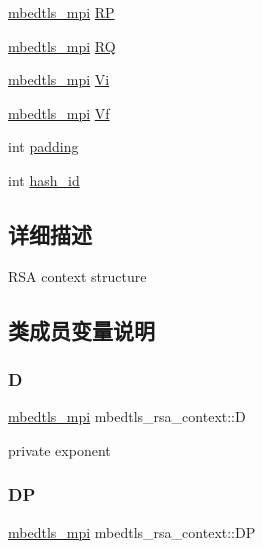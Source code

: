 \begin{DoxyCompactItemize}
\item 
\hyperlink{structmbedtls__mpi}{mbedtls\+\_\+mpi} \hyperlink{structmbedtls__rsa__context_a97215f3f5482cfb4887d00d47f030610}{RP}
\item 
\hyperlink{structmbedtls__mpi}{mbedtls\+\_\+mpi} \hyperlink{structmbedtls__rsa__context_a495e2de1f324a00ba83fe1aa72652a06}{RQ}
\item 
\hyperlink{structmbedtls__mpi}{mbedtls\+\_\+mpi} \hyperlink{structmbedtls__rsa__context_ae042ea2b11c2934694dbacb3656331ca}{Vi}
\item 
\hyperlink{structmbedtls__mpi}{mbedtls\+\_\+mpi} \hyperlink{structmbedtls__rsa__context_a5537a6306b03dbd02ba435738d660333}{Vf}
\item 
int \hyperlink{structmbedtls__rsa__context_ac78a4848175e4921f6beb677f4a49496}{padding}
\item 
int \hyperlink{structmbedtls__rsa__context_ab220b6999b79d75f2186b2ac67f5267c}{hash\+\_\+id}
\end{DoxyCompactItemize}


\subsection{详细描述}
R\+SA context structure 

\subsection{类成员变量说明}
\mbox{\label{structmbedtls__rsa__context_ad9552371239922dd67d146b937d1aada}} 
\subsubsection{\texorpdfstring{D}{D}}
{\footnotesize\ttfamily \hyperlink{structmbedtls__mpi}{mbedtls\+\_\+mpi} mbedtls\+\_\+rsa\+\_\+context\+::D}

private exponent \mbox{\label{structmbedtls__rsa__context_aa46b066a4cf04deb4e627e69e6b036e8}} 
\subsubsection{\texorpdfstring{DP}{DP}}
{\footnotesize\ttfamily \hyperlink{structmbedtls__mpi}{mbedtls\+\_\+mpi} mbedtls\+\_\+rsa\+\_\+context\+::\+DP}

